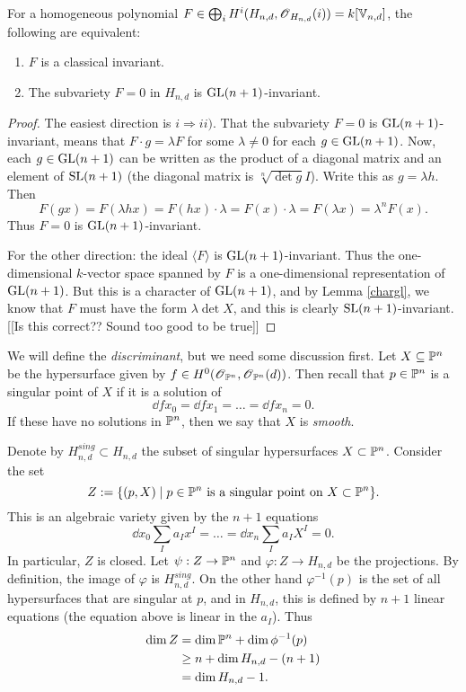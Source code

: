\documentclass[11pt, english]{article}
\newcommand{\vnd}{\mathbb V_{n,d}}
\begin{document}
\begin{prop}
 For a homogeneous polynomial $F \in \bigoplus_i H^i(H_{n,d}, \OO_{H_{n,d}}(i))=k[\vnd]$, the following are equivalent:
 \begin{enumerate}
 \item $F$ is a classical invariant.
\item The subvariety $F = 0$ in $H_{n,d}$ is $\operatorname{GL}(n+1)$-invariant.
 \end{enumerate}
\end{prop}
\begin{proof}
The easiest direction is $i \Rightarrow ii)$. That the subvariety $F=0$ is $\operatorname{GL}(n+1)$-invariant, means that $F \cdot g = \lambda F$ for some $\lambda \neq 0$ for each $g \in \operatorname{GL}(n+1)$. Now, each $g \in \operatorname{GL}(n+1)$ can be written as the product of a diagonal matrix and an element of $\operatorname{SL}(n+1)$ (the diagonal matrix is $\sqrt[n]{\det g}I$). Write this as $g=\lambda h$. Then
\[
F(gx)=F(\lambda hx)= F(hx) \cdot \lambda = F(x) \cdot \lambda = F(\lambda x) = \lambda^n F(x).
\]
Thus $F=0$ is $\operatorname{GL}(n+1)$-invariant.

For the other direction: the ideal $\langle F \rangle$ is $\operatorname{GL}(n+1)$-invariant. Thus the one-dimensional $k$-vector space spanned by $F$ is a one-dimensional representation of $\operatorname{GL}(n+1)$. But this is a character of $\operatorname{GL}(n+1)$, and by Lemma \ref{chargl}, we know that $F$ must have the form $\lambda \det X$, and this is clearly $\operatorname{SL}(n+1)$-invariant.
[[Is this correct?? Sound too good to be true]]
\end{proof}

We will define the \emph{discriminant}, but we need some discussion first. Let $X \subseteq \mathbb{P}^n$ be the hypersurface given by $f \in H^0(\operatorname{\mathscr{O}}_{\mathbb{P}^n},\operatorname{\mathscr{O}}_{\mathbb{P}^n}(d))$. Then recall that $p \in \mathbb{P}^n$ is a singular point of $X$ if it is a solution of
\[
\dd{f}{x_0}=\dd{f}{x_1} = \ldots = \dd{f}{x_n}=0.
\]
If these have no solutions in $\mathbb{P}^n$, then we say that $X$ is \emph{smooth}.

Denote by $H_{n,d}^{sing} \subset H_{n,d}$ the subset of singular hypersurfaces $X \subset \mathbb{P}^n$. Consider the set
\[
Z := \{ (p,X) \mid  p \in \mathbb{P}^n \text{ is a singular point on } X \subset \mathbb{P}^n \}.
\]
This is an algebraic variety given by the $n+1$ equations
\[
\dd{}{x_0} \sum_I a_I x^I = \ldots = \dd{}{x_n} \sum_I a_I X^I = 0.
\]
In particular, $Z$ is closed. Let $\psi:Z \to \mathbb{P}^n$ and $\varphi: Z \to H_{n,d}$ be the projections. By definition, the image of $\varphi$ is $H_{n,d}^{sing}$. On the other hand $\varphi^{-1}(p)$ is the set of all hypersurfaces that are singular at $p$, and in $H_{n,d}$, this is defined by $n+1$ linear equations (the equation above is linear in the $a_I$). Thus
\begin{align*}
  \dim Z &= \dim \mathbb{P}^n  + \dim \phi^{-1}(p) \\
&\geq n + \dim H_{n,d} - (n+1) \\
&= \dim H_{n,d} - 1.
\end{align*}
\end{document}
